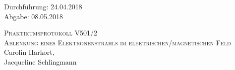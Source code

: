 

\begin{titlepage}
  \begin{flushleft}
 Durchführung: 24.04.2018\\
 Abgabe: 08.05.2018
  \end{flushleft}



 \begin{center}


\textsc{\LARGE Praktikumsprotokoll V501/2}\\[1.5cm]
\textsc{\huge Ablenkung eines Elektronenstrahls im elektrischen/magnetischen Feld } \\[5,5cm]

Carolin Harkort\footnotemark[1], \\
Jacqueline Schlingmann\footnotemark[2] \\[1,0cm]



 \end{center}

 \vfill

\end{titlepage}


  
  

\nocite{*}
\printbibliography

